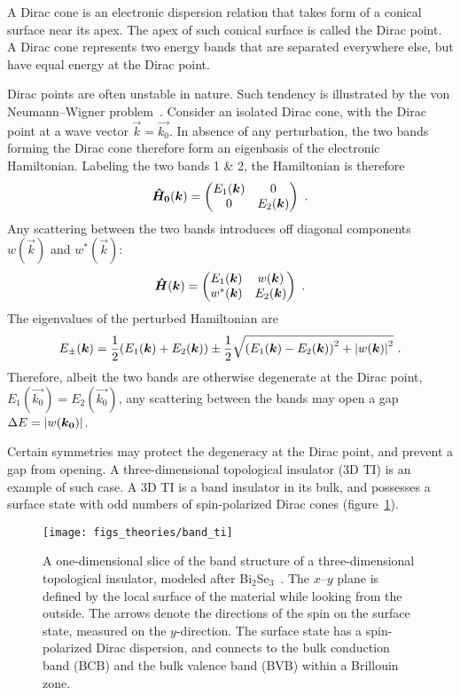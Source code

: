 ﻿A Dirac cone is an electronic dispersion relation that takes form of a conical surface near its apex. The apex of such conical surface is called the Dirac point. A Dirac cone represents two energy bands that are separated everywhere else, but have equal energy at the Dirac point.

Dirac points are often unstable in nature. Such tendency is illustrated by the von Neumann--Wigner problem~\cite{vonNeumann1993, Asano2011}. Consider an isolated Dirac cone, with the Dirac point at a wave vector $\vec{k}=\vec{k_0}$. In absence of any perturbation, the two bands forming the Dirac cone therefore form an eigenbasis of the electronic Hamiltonian. Labeling the two bands 1 \& 2, the Hamiltonian is therefore%
\begin{equation}
    \op{H_0}(\vec{k}) = %
        \begin{pmatrix}
            E_1(\vec{k}) & 0\\
            0 & E_2(\vec{k})
        \end{pmatrix}~.
\end{equation}%
Any scattering between the two bands introduces off diagonal components $w(\vec{k})$ and $w^*(\vec{k})$:%
\begin{equation}
    \op{H}(\vec{k}) = %
        \begin{pmatrix}
            E_1(\vec{k}) & w(\vec{k})\\
            w^*(\vec{k}) & E_2(\vec{k})
        \end{pmatrix}~.
\end{equation}%
The eigenvalues of the perturbed Hamiltonian are
\begin{equation}
    E_\pm(\vec{k}) = \frac{1}{2} \qty(E_1(\vec{k}) + E_2(\vec{k})) \pm \frac{1}{2} \sqrt{\qty(E_1(\vec{k}) - E_2(\vec{k}))^2 + \abs{w(\vec{k})}^2}~.
\end{equation}
Therefore, albeit the two bands are otherwise degenerate at the Dirac point, $E_1(\vec{k_0}) = E_2(\vec{k_0})$, any scattering between the bands may open a gap $\Delta{}E = \abs{w(\vec{k_0})}$.

Certain symmetries may protect the degeneracy at the Dirac point, and prevent a gap from opening. A three-dimensional topological insulator (3D TI) is an example of such case. A 3D TI is a band insulator in its bulk, and possesses a surface state with odd numbers of spin-polarized Dirac cones (figure~\ref{fig:bg_ti}).%
\begin{figure}[ht]%
    \centering%
    \texttt{[image: figs\_theories/band\_ti]}%
    \caption[Band structure of a 3D topological insulator]{\label{fig:bg_ti}A one-dimensional slice of the band structure of a three-dimensional topological insulator, modeled after Bi$_2$Se$_3$~\cite{TI_Qi}. The $x$--$y$ plane is defined by the local surface of the material while looking from the outside. The arrows denote the directions of the spin on the surface state, measured on the $y$-direction. The surface state has a spin-polarized Dirac dispersion, and connects to the bulk conduction band (BCB) and the bulk valence band (BVB) within a Brillouin zone.}%
\end{figure}%

